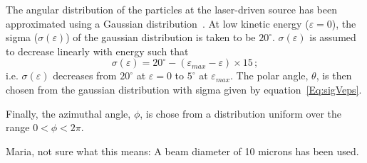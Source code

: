 The angular distribution of the particles at the laser-driven source
has been approximated using a Gaussian
distribution~\cite{10.1038/s41598-019-41705-0}.  
At low kinetic energy ($\varepsilon = 0$), the sigma
($\sigma(\varepsilon)$) of the gaussian distribution is taken to be
$20^\circ$.
$\sigma(\varepsilon)$ is assumed to decrease linearly with energy such
that
\begin{equation}
  \sigma(\varepsilon) = 20^\circ - (\varepsilon_{max}
                           - \varepsilon)\times15 \, ;
  \label{Eq:sigVeps}
\end{equation}
i.e. $\sigma(\varepsilon)$ decreases from $20^\circ$ at
$\varepsilon=0$ to $5^\circ$ at $\varepsilon_{max}$.
The polar angle, $\theta$, is then chosen from the gaussian
distribution with sigma given by equation~\ref{Eq:sigVeps}.

Finally, the azimuthal angle, $\phi$, is chose from a distribution
uniform over the range $0 < \phi < 2\pi$.

{\color{red} Maria, not sure what this means: A beam diameter of 10
microns has been used.}
